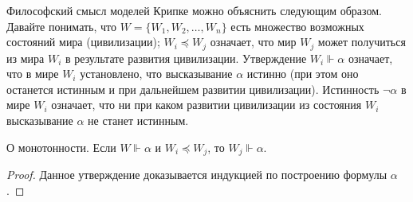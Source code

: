 Философский смысл моделей Крипке можно объяснить следующим образом. Давайте понимать, 
что $W = \{ W_1, W_2, \dots, W_n\}$  есть множество возможных состояний мира (цивилизации); 
$W_i \preceq W_j$ означает, что мир $W_j$ может получиться 
из мира $W_i$ в результате развития цивилизации. Утверждение $W_i \Vdash \alpha$ означает, 
что в мире  $W_i$ установлено, что высказывание $\alpha$ истинно 
(при этом оно останется истинным и при дальнейшем развитии цивилизации). Истинность $\neg\alpha$ 
в мире $W_i$ означает, что ни при каком развитии цивилизации из 
состояния $W_i$ высказывание $\alpha$ не станет истинным.


\begin{lemma}{О монотонности.}
Если $W \Vdash \alpha$ и $W_i \preceq W_j$, то $W_j \Vdash \alpha$.
\end{lemma}
\begin{proof} 
Данное утверждение доказывается индукцией по построению формулы $\alpha$.
\end{proof}


